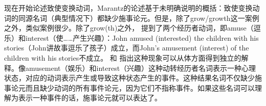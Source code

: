 \begin{exe}
\begin{xlist}[iv.]
\begin{exe}
\begin{xlist}[iv.]
现在开始论述致使变换动词，Marantz的论述基于未明确说明的概括：致使变换动词的同源名词（典型情况下）都缺少施事论元。但是，除了grow/growth这一案例之外，类似案例很少。除了grow(th)之外， \citet[例（7c）和（8c）]{Chomsky70a}提到了两个经历者动词，即amuse（逗乐）和interest（使……产生兴趣）：John amused (interested) the children with his stories（John讲故事逗乐了孩子）成立，而John's amusement (interest) of the children with his stories不成立。 \citet{Rappaport83a-u}和 \citet{Dowty89b-u}指出这种现象可以从体方面得到独立的解释。像amusement（娱乐）和interest（兴趣）这种动转经历者名词表示一种心理状态，对应的动词表示产生或导致这种状态产生的事件。这种结果名词不仅缺少施事论元而且缺少动词的所有事件论元，因为它们不指称事件。如果这些名词可以理解为表示一种事件的话，施事论元就可以表达了。

\end{xlist}
\end{exe}
\end{xlist}
\end{exe}
